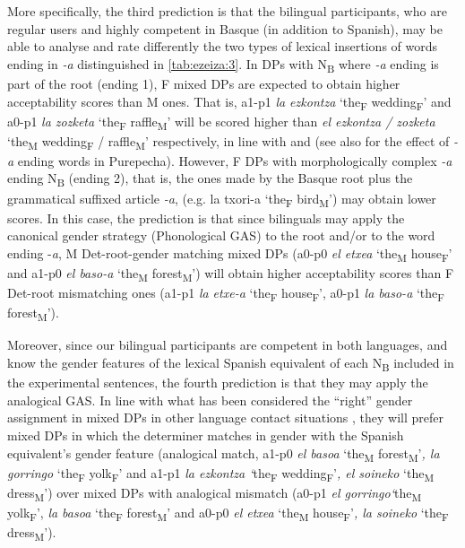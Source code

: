 \documentclass[output=paper]{langscibook}
\begin{document}
More specifically, the third prediction is that the bilingual participants, who are regular users and highly competent in Basque (in addition to Spanish), may be able to analyse and rate differently the two types of lexical insertions of words ending in \textit{-a} distinguished in \ref{tab:ezeiza:3}. In DPs with N\textsubscript{B} where \textit{-a} ending is part of the root (ending 1), F mixed DPs are expected to obtain higher acceptability scores than M ones. That is, a1-p1 \textit{la ezkontza} ‘the\textsubscript{F} wedding\textsubscript{F}’ and a0-p1 \textit{la zozketa} ‘the\textsubscript{F} raffle\textsubscript{M}’ will be scored higher than \textit{el ezkontza / zozketa} ‘the\textsubscript{M} wedding\textsubscript{F} / raffle\textsubscript{M}’ respectively, in line with \citet{BadiolaSande2018} and \citet{Munarriz-IbarrolaEtAl2022} (see also \citet{BellamyEtAl2018} for the effect of \textit{-a} ending words in Purepecha). However, F DPs with morphologically complex \textit{-a} ending N\textsubscript{B} (ending 2), that is, the ones made by the Basque root plus the grammatical suffixed article \textit{-a}, (e.g. la txori-a ‘the\textsubscript{F} bird\textsubscript{M}’) may obtain lower scores. In this case, the prediction is that since bilinguals may apply the canonical gender strategy (Phonological GAS) to the root and/or to the word ending -\textit{a}, M Det-root-gender matching mixed DPs (a0-p0 \textit{el etxea} ‘the\textsubscript{M} house\textsubscript{F}’ and a1-p0 \textit{el baso-a} ‘the\textsubscript{M} forest\textsubscript{M}’) will obtain higher acceptability scores than F Det-root mismatching ones (a1-p1 \textit{la etxe-a} ‘the\textsubscript{F} house\textsubscript{F}’, a0-p1 \textit{la baso-a} ‘the\textsubscript{F} forest\textsubscript{M}’).

Moreover, since our bilingual participants are competent in both languages, and know the gender features of the lexical Spanish equivalent of each N\textsubscript{B} included in the experimental sentences, the fourth prediction is that they may apply the analogical GAS. In line with what has been considered the “right” gender assignment in mixed DPs in other language contact situations \citep{JorschickEtAl2011}, they will prefer mixed DPs in which the determiner matches in gender with the Spanish equivalent’s gender feature (analogical match, a1-p0 \textit{el basoa} ‘the\textsubscript{M} forest\textsubscript{M}’\textit{, la gorringo} ‘the\textsubscript{F} yolk\textsubscript{F}’ and a1-p1 \textit{la ezkontza ‘}the\textsubscript{F} wedding\textsubscript{F}’\textit{, el soineko} ‘the\textsubscript{M} dress\textsubscript{M}’) over mixed DPs with analogical mismatch (a0-p1 \textit{el gorringo‘}the\textsubscript{M} yolk\textsubscript{F}’, \textit{la basoa} ‘the\textsubscript{F} forest\textsubscript{M}’ and a0-p0 \textit{el etxea} ‘the\textsubscript{M} house\textsubscript{F}’\textit{, la soineko} ‘the\textsubscript{F} dress\textsubscript{M}’).
\end{document}
